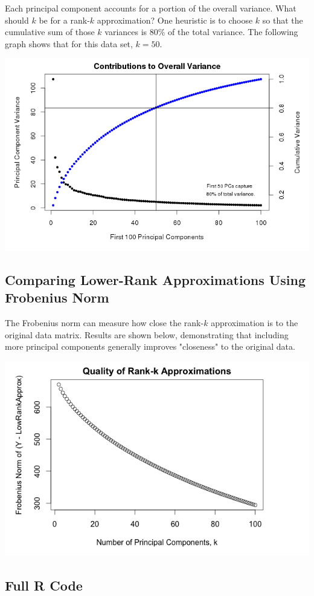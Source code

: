 \documentclass[12pt,letterpaper]{article}\usepackage[]{graphicx}\usepackage[]{color}
\begin{document}
  Each principal component accounts for a portion of the overall variance. What
  should $k$ be for a rank-$k$ approximation? One heuristic is to choose $k$ so
  that the cumulative sum of those $k$ variances is 80\% of the total variance.
  The following graph shows that for this data set, $k=50$.\\
  \begin{center}
  \includegraphics[width=.7\textwidth, keepaspectratio]
    {pca-cumulative-variance.png}
  \end{center}

\subsection{Comparing Lower-Rank Approximations Using Frobenius Norm}

  The Frobenius norm can measure how close the rank-$k$ approximation is to the 
  original data matrix. Results are shown below, demonstrating that including
  more principal components generally improves "closeness" to the original data.
  
  \begin{center}
  \includegraphics[width=.7\textwidth, keepaspectratio]{pca-frobenius.png}
  \end{center}

\newpage
\subsection{Full R Code}
\end{document}
